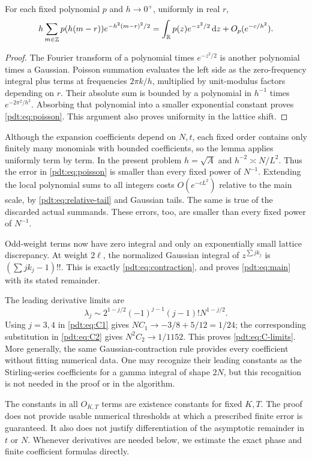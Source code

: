 \begin{lemma}\label{pdt:lem:poisson}
For each fixed polynomial $p$ and $h\to0^+$, uniformly in real $r$,
\begin{equation}\label{pdt:eq:poisson}
 h\sum_{m\in\mathbb Z}p(h(m-r))e^{-h^2(m-r)^2/2}
 =\int_{\mathbb R}p(z)e^{-z^2/2}\,\mathrm d z+O_p(e^{-c/h^2}).
\end{equation}
\end{lemma}
\begin{proof}
The Fourier transform of a polynomial times $e^{-z^2/2}$ is another polynomial times a Gaussian. Poisson summation evaluates the left side as the zero-frequency integral plus terms at frequencies $2\pi k/h$, multiplied by unit-modulus factors depending on $r$. Their absolute sum is bounded by a polynomial in $h^{-1}$ times $e^{-2\pi^2/h^2}$. Absorbing that polynomial into a smaller exponential constant proves \eqref{pdt:eq:poisson}. This argument also proves uniformity in the lattice shift.
\end{proof}
Although the expansion coefficients depend on $N,t$, each fixed order contains only finitely many monomials with bounded coefficients, so the lemma applies uniformly term by term. In the present problem $h=\sqrt A$ and $h^{-2}\asymp N/L^2$. Thus the error in \eqref{pdt:eq:poisson} is smaller than every fixed power of $N^{-1}$. Extending the local polynomial sums to all integers costs $O(e^{-cL^2})$ relative to the main scale, by \eqref{pdt:eq:relative-tail} and Gaussian tails. The same is true of the discarded actual summands. These errors, too, are smaller than every fixed power of $N^{-1}$.

Odd-weight terms now have zero integral and only an exponentially small lattice discrepancy. At weight $2\ell$, the normalized Gaussian integral of $z^{\sum jk_j}$ is $(\sum jk_j-1)!!$. This is exactly \eqref{pdt:eq:contraction}, and proves \eqref{pdt:eq:main} with its stated remainder.

The leading derivative limits are
\begin{equation}\label{pdt:eq:lambda-leading}
 \lambda_j\sim 2^{1-j/2}(-1)^{j-1}(j-1)!N^{1-j/2}.
\end{equation}
Using $j=3,4$ in \eqref{pdt:eq:C1} gives $N C_1\to-3/8+5/12=1/24$; the corresponding substitution in \eqref{pdt:eq:C2} gives $N^2C_2\to1/1152$. This proves \eqref{pdt:eq:C-limits}. More generally, the same Gaussian-contraction rule provides every coefficient without fitting numerical data. One may recognize their leading constants as the Stirling-series coefficients for a gamma integral of shape $2N$, but this recognition is not needed in the proof or in the algorithm.

\begin{remark}
The constants in all $O_{K,T}$ terms are existence constants for fixed $K,T$. The proof does not provide usable numerical thresholds at which a prescribed finite error is guaranteed. It also does not justify differentiation of the asymptotic remainder in $t$ or $N$. Whenever derivatives are needed below, we estimate the exact phase and finite coefficient formulas directly.
\end{remark}

